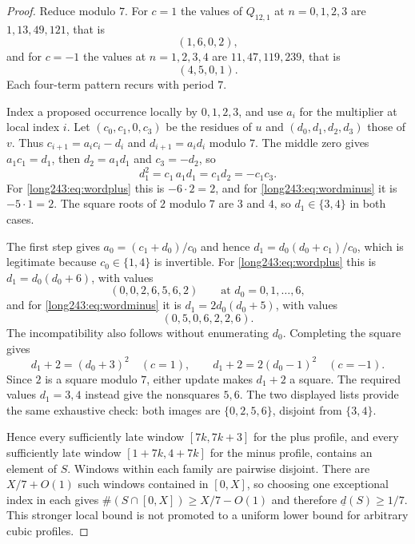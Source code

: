 \documentclass[11pt]{article}
\begin{document}
\begin{proof}
Reduce modulo $7$.  For $c=1$ the values of $Q_{12,1}$ at $n=0,1,2,3$ are
$1,13,49,121$, that is
\begin{equation}\label{long243:eq:wordplus}
 (1,6,0,2),
\end{equation}
and for $c=-1$ the values at $n=1,2,3,4$ are $11,47,119,239$, that is
\begin{equation}\label{long243:eq:wordminus}
 (4,5,0,1).
\end{equation}
Each four-term pattern recurs with period $7$.

Index a proposed occurrence locally by $0,1,2,3$, and use $a_i$ for the
multiplier at local index $i$. Let $(c_0,c_1,0,c_3)$ be the residues of
$u$ and $(d_0,d_1,d_2,d_3)$ those of $v$. Thus
$c_{i+1}=a_ic_i-d_i$ and $d_{i+1}=a_id_i$ modulo $7$.  The middle zero gives
$a_1c_1=d_1$, then $d_2=a_1d_1$ and $c_3=-d_2$, so
\begin{equation}\label{long243:eq:d1square}
 d_1^2=c_1\,a_1d_1=c_1d_2=-c_1c_3 .
\end{equation}
For \eqref{long243:eq:wordplus} this is $-6\cdot2=2$, and for \eqref{long243:eq:wordminus} it
is $-5\cdot1=2$.  The square roots of $2$ modulo $7$ are $3$ and $4$, so
$d_1\in\{3,4\}$ in both cases.

The first step gives $a_0=(c_1+d_0)/c_0$ and hence
$d_1=d_0(d_0+c_1)/c_0$, which is legitimate because $c_0\in\{1,4\}$ is
invertible.  For \eqref{long243:eq:wordplus} this is $d_1=d_0(d_0+6)$, with values
\[
 (0,0,2,6,5,6,2) \qquad\text{at } d_0=0,1,\ldots,6,
\]
and for \eqref{long243:eq:wordminus} it is $d_1=2d_0(d_0+5)$, with values
\[
 (0,5,0,6,2,2,6).
\]
The incompatibility also follows without enumerating $d_0$. Completing
the square gives
\[
 d_1+2=(d_0+3)^2\quad(c=1),\qquad
 d_1+2=2(d_0-1)^2\quad(c=-1).
\]
Since $2$ is a square modulo $7$, either update makes $d_1+2$ a square.
The required values $d_1=3,4$ instead give the nonsquares $5,6$.
The two displayed lists provide the same exhaustive check: both images
are $\{0,2,5,6\}$, disjoint from $\{3,4\}$.

Hence every sufficiently late window $[7k,7k+3]$ for the plus profile,
and every sufficiently late window $[1+7k,4+7k]$ for the minus profile,
contains an element of $S$. Windows within each family are pairwise disjoint.
There are $X/7+O(1)$ such windows contained in $[0,X]$, so choosing one
exceptional index in each gives $\#(S\cap[0,X])\ge X/7-O(1)$ and therefore
$\underline d(S)\ge1/7$. This stronger local bound is not promoted to a
uniform lower bound for arbitrary cubic profiles.
\end{proof}
\end{document}
